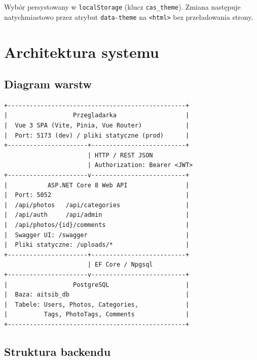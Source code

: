 \documentclass[12pt, a4paper]{article}
\begin{document}
Wybór persystowany w \texttt{localStorage} (klucz \texttt{cas\_theme}). Zmiana następuje
natychmiastowo przez atrybut \texttt{data-theme} na \texttt{<html>} bez przeładowania strony.

\section{Architektura systemu}

\subsection{Diagram warstw}

\begin{lstlisting}[style=plain, caption={Diagram warstw systemu}]
+-------------------------------------------------+
|                  Przegladarka                   |
|  Vue 3 SPA (Vite, Pinia, Vue Router)            |
|  Port: 5173 (dev) / pliki statyczne (prod)      |
+----------------------+--------------------------+
                       | HTTP / REST JSON
                       | Authorization: Bearer <JWT>
+----------------------v--------------------------+
|           ASP.NET Core 8 Web API                |
|  Port: 5052                                     |
|  /api/photos   /api/categories                  |
|  /api/auth     /api/admin                       |
|  /api/photos/{id}/comments                      |
|  Swagger UI: /swagger                           |
|  Pliki statyczne: /uploads/*                    |
+----------------------+--------------------------+
                       | EF Core / Npgsql
+----------------------v--------------------------+
|                  PostgreSQL                     |
|  Baza: aitsib_db                                |
|  Tabele: Users, Photos, Categories,             |
|          Tags, PhotoTags, Comments              |
+-------------------------------------------------+
\end{lstlisting}

\subsection{Struktura backendu}
\end{document}
